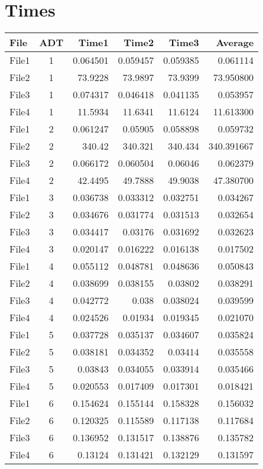 \documentclass[12pt]{article}
\begin{document}
\section{Times}
\begin{center}
    \begin{tabular}{l c r r r r}
        File  & ADT & Time1    & Time2    & Time3    & Average    \\

        \hline %
        File1 & 1   & 0.064501 & 0.059457 & 0.059385 & 0.061114   \\
        File2 & 1   & 73.9228  & 73.9897  & 73.9399  & 73.950800  \\
        File3 & 1   & 0.074317 & 0.046418 & 0.041135 & 0.053957   \\
        File4 & 1   & 11.5934  & 11.6341  & 11.6124  & 11.613300  \\
        \hline %
        File1 & 2   & 0.061247 & 0.05905  & 0.058898 & 0.059732   \\
        File2 & 2   & 340.42   & 340.321  & 340.434  & 340.391667 \\
        File3 & 2   & 0.066172 & 0.060504 & 0.06046  & 0.062379   \\
        File4 & 2   & 42.4495  & 49.7888  & 49.9038  & 47.380700  \\
        \hline %
        File1 & 3   & 0.036738 & 0.033312 & 0.032751 & 0.034267   \\
        File2 & 3   & 0.034676 & 0.031774 & 0.031513 & 0.032654   \\
        File3 & 3   & 0.034417 & 0.03176  & 0.031692 & 0.032623   \\
        File4 & 3   & 0.020147 & 0.016222 & 0.016138 & 0.017502   \\
        \hline %
        File1 & 4   & 0.055112 & 0.048781 & 0.048636 & 0.050843   \\
        File2 & 4   & 0.038699 & 0.038155 & 0.03802  & 0.038291   \\
        File3 & 4   & 0.042772 & 0.038    & 0.038024 & 0.039599   \\
        File4 & 4   & 0.024526 & 0.01934  & 0.019345 & 0.021070   \\
        \hline %
        File1 & 5   & 0.037728 & 0.035137 & 0.034607 & 0.035824   \\
        File2 & 5   & 0.038181 & 0.034352 & 0.03414  & 0.035558   \\
        File3 & 5   & 0.03843  & 0.034055 & 0.033914 & 0.035466   \\
        File4 & 5   & 0.020553 & 0.017409 & 0.017301 & 0.018421   \\
        \hline %
        File1 & 6   & 0.154624 & 0.155144 & 0.158328 & 0.156032   \\
        File2 & 6   & 0.120325 & 0.115589 & 0.117138 & 0.117684   \\
        File3 & 6   & 0.136952 & 0.131517 & 0.138876 & 0.135782   \\
        File4 & 6   & 0.13124  & 0.131421 & 0.132129 & 0.131597
    \end{tabular}
\end{center}
\end{document}
